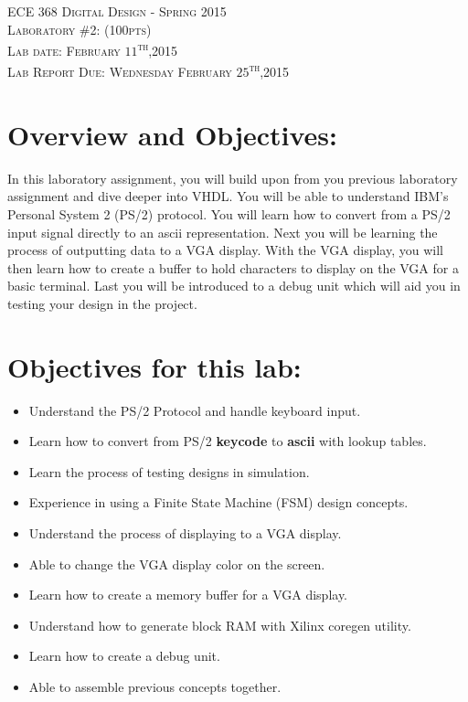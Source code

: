 \documentclass{article}
\begin{document}
\begin{center}
\textsc{\huge ECE 368 Digital Design - Spring 2015}\\[1cm]
\textsc{{\LARGE Laboratory \#2: (100pts)}}\\[0.5cm]
\textsc{\Large Lab date: February $11$\textsuperscript{th},2015}\\[0.5cm]
\textsc{\Large Lab Report Due: Wednesday February $25$\textsuperscript{th},2015}\\[1cm]
\end{center}

\section{Overview and Objectives:}
In this laboratory assignment, you will build upon from you previous laboratory assignment and dive deeper into VHDL. You will be able to understand IBM's Personal System 2 (PS/2) protocol. You will learn how to convert from a PS/2 input signal directly to an ascii representation. Next you will be learning the process of outputting data to a VGA display. With the VGA display, you will then learn how to create a buffer to hold characters to display on the VGA for a basic terminal. Last you will be introduced to a debug unit which will aid you in testing your design in the project.

\section{Objectives for this lab:}
\begin{itemize}
  \item Understand the PS/2 Protocol and handle keyboard input.
  \item Learn how to convert from PS/2 \textbf{keycode} to \textbf{ascii} with lookup tables.
  \item Learn the process of testing designs in simulation.
  \item Experience in using a Finite State Machine (FSM) design concepts.
  \item Understand the process of displaying to a VGA display.
  \item Able to change the VGA display color on the screen.
  \item Learn how to create a memory buffer for a VGA display.
  \item Understand how to generate block RAM with Xilinx\textsuperscript{\textregistered} coregen utility.
  \item Learn how to create a debug unit.
  \item Able to assemble previous concepts together.
\end{itemize}
\end{document}
